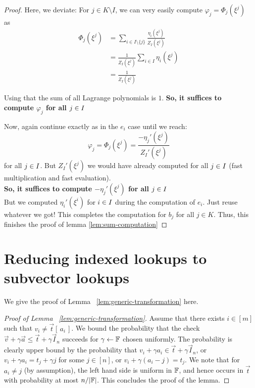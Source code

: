 \begin{proof}
    Here, we deviate: For $j \in K\setminus I$, we can very easily compute $\varphi_j=\Phi_j(\xi^j)$ as
    \begin{align*}
        \Phi_j(\xi^j)&=\sum_{i\in I\setminus \{j\}} \frac{\eta_i(\xi^j)}{Z_I(\xi^j)}\\
        &=\frac{1}{Z_I(\xi^j)} \sum_{i\in I}\eta_i(\xi^j)\\
        &=\frac{1}{Z_I(\xi^j)}
    \end{align*}

    Using that the sum of all Lagrange polynomials is $1$. \textbf{So, it suffices to compute $\varphi_j$ for all $j \in I$}

    Now, again continue exactly as in the $e_i$ case until we reach:
    $$\varphi_j =\Phi_j(\xi^j) = \frac{-\eta_j'(\xi^j)}{Z_I'(\xi^j)}$$
    for all $j \in I$. But $Z_I'(\xi^j)$ we would have already computed for all $j \in I$ (fast multiplication and fast evaluation). \\
    \textbf{So, it suffices to compute $-\eta_j'(\xi^j)$ for all $j \in I$\\}
    But we computed $\eta_i'(\xi^i)$ for $i\in I$ during the computation of $e_i$. Just reuse whatever we got!
    This completes the computation for $b_j$ for all $j \in K$.
    Thus, this finishes the proof of lemma \ref{lem:sum-computation}
\end{proof}


\section{Reducing indexed lookups to subvector lookups}\label{sec:generic-transformation-app}
We give the proof of Lemma ~\ref{lem:generic-transformation} here.
\begin{proof}[Proof of Lemma ~\ref{lem:generic-transformation}]
Assume that there exists $i\in [m]$ such that $v_i\neq \vec{t}[\,a_i\,]$.
 We bound the probability
that the check $\vec{v} + \gamma \vec{a}\leq \vec{t}+\gamma \vec{I}_n$ succeeds for
$\gamma\gets \mathbb{F}$ chosen uniformly. The probability is clearly upper bound by the probability
that $v_i + \gamma a_i\in \vec{t}+\gamma \vec{I}_n$, or $v_i+\gamma a_i=t_j + \gamma j$ for
some $j\in [n]$, or $v_i + \gamma (a_i - j)=t_j$. We note that for $a_i\neq j$ (by assumption),
the left hand side is uniform in $\mathbb{F}$, and hence occurs in $\vec{t}$ with probability at most
$n/|\mathbb{F}|$. This concludes the proof of the lemma.
\end{proof}

